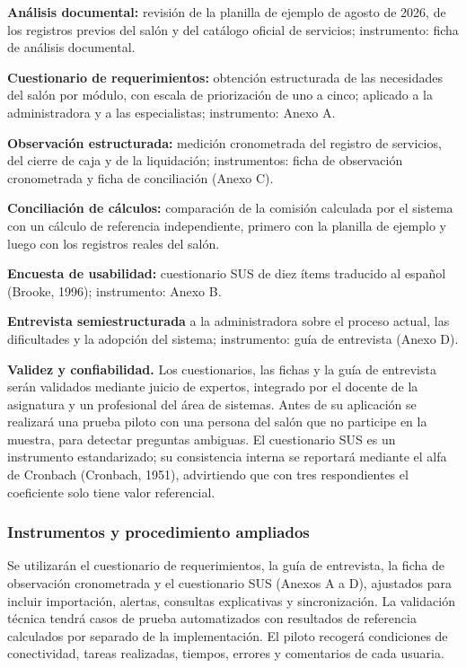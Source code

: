 \begin{vinetas}
\item \textbf{Análisis documental:} revisión de la planilla de ejemplo de agosto de 2026, de los registros previos del salón y del catálogo oficial de servicios; instrumento: ficha de análisis documental.
\item \textbf{Cuestionario de requerimientos:} obtención estructurada de las necesidades del salón por módulo, con escala de priorización de uno a cinco; aplicado a la administradora y a las especialistas; instrumento: Anexo A.
\item \textbf{Observación estructurada:} medición cronometrada del registro de servicios, del cierre de caja y de la liquidación; instrumentos: ficha de observación cronometrada y ficha de conciliación (Anexo C).
\item \textbf{Conciliación de cálculos:} comparación de la comisión calculada por el sistema con un cálculo de referencia independiente, primero con la planilla de ejemplo y luego con los registros reales del salón.
\item \textbf{Encuesta de usabilidad:} cuestionario SUS de diez ítems traducido al español (Brooke, 1996); instrumento: Anexo B.
\item \textbf{Entrevista semiestructurada} a la administradora sobre el proceso actual, las dificultades y la adopción del sistema; instrumento: guía de entrevista (Anexo D).
\end{vinetas}

\textbf{Validez y confiabilidad.} Los cuestionarios, las fichas y la guía de entrevista serán validados mediante juicio de expertos, integrado por el docente de la asignatura y un profesional del área de sistemas. Antes de su aplicación se realizará una prueba piloto con una persona del salón que no participe en la muestra, para detectar preguntas ambiguas. El cuestionario SUS es un instrumento estandarizado; su consistencia interna se reportará mediante el alfa de Cronbach (Cronbach, 1951), advirtiendo que con tres respondientes el coeficiente solo tiene valor referencial.


\subsubsection{Instrumentos y procedimiento ampliados}

Se utilizarán el cuestionario de requerimientos, la guía de entrevista, la ficha de observación cronometrada y el cuestionario SUS (Anexos A a D), ajustados para incluir importación, alertas, consultas explicativas y sincronización. La validación técnica tendrá casos de prueba automatizados con resultados de referencia calculados por separado de la implementación. El piloto recogerá condiciones de conectividad, tareas realizadas, tiempos, errores y comentarios de cada usuaria.


